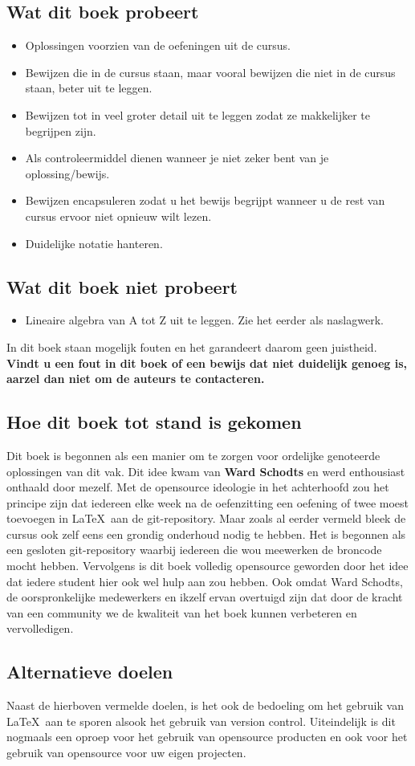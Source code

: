 \documentclass[lineaire_algebra_oplossingen.tex]{subfiles}
\begin{document}
\subsection*{Wat dit boek probeert}
\begin{itemize}
\item Oplossingen voorzien van de oefeningen uit de cursus.
\item Bewijzen die in de cursus staan, maar vooral bewijzen die niet in de cursus staan, beter uit te leggen.
\item Bewijzen tot in veel groter detail uit te leggen zodat ze makkelijker te begrijpen zijn. 
\item Als controleermiddel dienen wanneer je niet zeker bent van je oplossing/bewijs.
\item Bewijzen encapsuleren zodat u het bewijs begrijpt wanneer u de rest van cursus ervoor niet opnieuw wilt lezen. 
\item Duidelijke notatie hanteren.
\end{itemize}

\subsection*{Wat dit boek niet probeert}
\begin{itemize}
\item Lineaire algebra van A tot Z uit te leggen. Zie het eerder als naslagwerk.
\end{itemize}
In dit boek staan mogelijk fouten en het garandeert daarom geen juistheid.
\textbf{Vindt u een fout in dit boek of een bewijs dat niet duidelijk genoeg is, aarzel dan niet om de auteurs te contacteren.}

\subsection*{Hoe dit boek tot stand is gekomen}
Dit boek is begonnen als een manier om te zorgen voor ordelijke genoteerde oplossingen van dit vak.
Dit idee kwam van \textbf{Ward Schodts} en werd enthousiast onthaald door mezelf.
Met de opensource ideologie in het achterhoofd zou het principe zijn dat iedereen elke week na de oefenzitting een oefening of twee moest toevoegen in \LaTeX \ aan de git-repository.
Maar zoals al eerder vermeld bleek de cursus ook zelf eens een grondig onderhoud nodig te hebben.
Het is begonnen als een gesloten git-repository waarbij iedereen die wou meewerken de broncode mocht hebben.
Vervolgens is dit boek volledig opensource geworden door het idee dat iedere student hier ook wel hulp aan zou hebben.
Ook omdat Ward Schodts, de oorspronkelijke medewerkers en ikzelf ervan overtuigd zijn dat door de kracht van een community we de kwaliteit van het boek kunnen verbeteren en vervolledigen.

\subsection*{Alternatieve doelen}
Naast de hierboven vermelde doelen, is het ook de bedoeling om het gebruik van \LaTeX \ aan te sporen alsook het gebruik van version control.
Uiteindelijk is dit nogmaals een oproep voor het gebruik van opensource producten en ook voor het gebruik van opensource voor uw eigen projecten.
\end{document}
